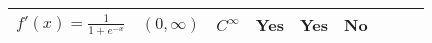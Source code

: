 \documentclass[]{book}
\begin{document}
\begin{longtable}[]{@{}cllllllll@{}}
\begin{minipage}[t]{0.19\columnwidth}
\(\displaystyle f'(x)={\frac {1}{1+e^{-x}}}\)\strut
\end{minipage} & \begin{minipage}[t]{0.06\columnwidth}\raggedright\strut
\((0,\infty)\)\strut
\end{minipage} & \begin{minipage}[t]{0.05\columnwidth}\raggedright\strut
\(C^\infty\)\strut
\end{minipage} & \begin{minipage}[t]{0.03\columnwidth}\raggedright\strut
Yes\strut
\end{minipage} & \begin{minipage}[t]{0.04\columnwidth}\raggedright\strut
Yes\strut
\end{minipage} & \begin{minipage}[t]{0.05\columnwidth}\raggedright\strut
No\strut
\end{minipage}\tabularnewline
\bottomrule
\end{longtable}
\end{document}
